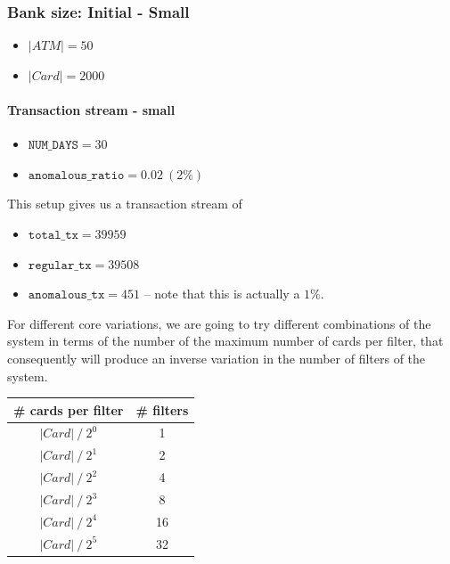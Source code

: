 \subsubsection{Bank size: Initial - Small}

\begin{itemize}
  \item $|ATM| = 50$
  \item $|Card| = 2000$
\end{itemize}

\paragraph{Transaction stream - small\\}

\begin{itemize}
  \item $\texttt{NUM\_DAYS} = 30$
  \item $\texttt{anomalous\_ratio} = 0.02\ (2\%)$ 
\end{itemize}

This setup gives us a transaction stream of 
\begin{itemize}
  \item $\texttt{total\_tx} = 39959$
  \item $\texttt{regular\_tx} = 39508$
  \item $\texttt{anomalous\_tx} = 451$ -- note that this is actually a $1\%$.
\end{itemize}

For different core variations, we are going to try different combinations of the system in terms
of the number of the maximum number of cards per filter, that consequently will produce an inverse variation in the number of filters of the system.

\begin{table}[H]
  \renewcommand{\arraystretch}{1.5} %
  \centering
  \begin{tabular}{|c|c|}
  \hline
  \# cards per filter & \# filters \\ \hline
  $|Card|\ / \ {2^0} $  &   1     \\ \hline
  $|Card|\ / \ {2^1} $ &   2     \\ \hline
  $|Card|\ / \ {2^2} $ &   4     \\ \hline
  $|Card|\ / \ {2^3} $ &   8     \\ \hline
  $|Card|\ / \ {2^4} $ &   16    \\ \hline
  $|Card|\ / \ {2^5} $ &   32    \\ \hline
  \end{tabular}
\end{table}

